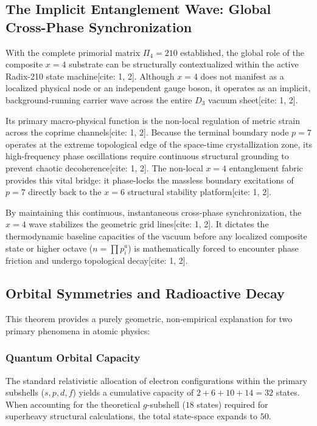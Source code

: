 \documentclass[11pt,a4paper]{article}
\theoremstyle{plain}
\theoremstyle{definition}
\theoremstyle{remark}
\begin{document}
\subsection{The Implicit Entanglement Wave: Global Cross-Phase Synchronization}
With the complete primorial matrix $\Pi_4 = 210$ established, the global role of the composite $x=4$ substrate can be structurally contextualized within the active Radix-210 state machine[cite: 1, 2]. Although $x=4$ does not manifest as a localized physical node or an independent gauge boson, it operates as an implicit, background-running carrier wave across the entire $D_3$ vacuum sheet[cite: 1, 2].

Its primary macro-physical function is the non-local regulation of metric strain across the coprime channels[cite: 1, 2]. Because the terminal boundary node $p=7$ operates at the extreme topological edge of the space-time crystallization zone, its high-frequency phase oscillations require continuous structural grounding to prevent chaotic decoherence[cite: 1, 2]. The non-local $x=4$ entanglement fabric provides this vital bridge: it phase-locks the massless boundary excitations of $p=7$ directly back to the $x=6$ structural stability platform[cite: 1, 2]. 

By maintaining this continuous, instantaneous cross-phase synchronization, the $x=4$ wave stabilizes the geometric grid lines[cite: 1, 2]. It dictates the thermodynamic baseline capacities of the vacuum before any localized composite state or higher octave ($n = \prod p_i^a$) is mathematically forced to encounter phase friction and undergo topological decay[cite: 1, 2].

\subsection{Orbital Symmetries and Radioactive Decay}
This theorem provides a purely geometric, non-empirical explanation for two primary phenomena in atomic physics:

\subsubsection{Quantum Orbital Capacity}
The standard relativistic allocation of electron configurations within the primary subshells ($s, p, d, f$) yields a cumulative capacity of $2 + 6 + 10 + 14 = 32$ states. When accounting for the theoretical $g$-subshell ($18$ states) required for superheavy structural calculations, the total state-space expands to $50$. 
\end{document}
